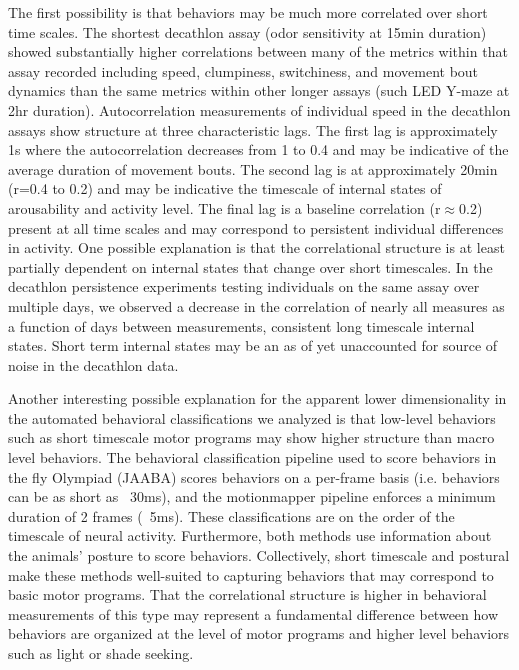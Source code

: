 \documentclass[12pt,letterpaper]{article}
\begin{document}
The first possibility is that behaviors may be much more correlated over short time scales. The shortest decathlon assay (odor sensitivity at 15min duration) showed substantially higher correlations between many of the metrics within that assay recorded including speed, clumpiness, switchiness, and movement bout dynamics than the same metrics within other longer assays (such LED Y-maze at 2hr duration).   Autocorrelation measurements of individual speed in the decathlon assays show structure at three characteristic lags. The first lag is approximately 1s where the autocorrelation decreases from 1 to 0.4 and may be indicative of the average duration of movement bouts. The second lag is at approximately 20min (r=0.4 to 0.2) and may be indicative the timescale of internal states of arousability and activity level. The final lag is a baseline correlation (r$\approx$0.2) present at all time scales and may correspond to persistent individual differences in activity. One possible explanation is that the correlational structure is at least partially dependent on internal states that change over short timescales. In the decathlon persistence experiments testing individuals on the same assay over multiple days, we observed a decrease in the correlation of nearly all measures as a function of days between measurements, consistent long timescale internal states. Short term internal states may be an as of yet unaccounted for source of noise in the decathlon data.

Another interesting possible explanation for the apparent lower dimensionality in the automated behavioral classifications we analyzed is that low-level behaviors such as short timescale motor programs may show higher structure than macro level behaviors. The behavioral classification pipeline used to score behaviors in the fly Olympiad (JAABA) scores behaviors on a per-frame basis (i.e. behaviors can be as short as ~30ms), and the motionmapper pipeline enforces a minimum duration of 2 frames (~5ms). These classifications are on the order of the timescale of neural activity. Furthermore, both methods use information about the animals' posture to score behaviors. Collectively, short timescale and postural make these methods well-suited to capturing behaviors that may correspond to basic motor programs. That the correlational structure is higher in behavioral measurements of this type may represent a fundamental difference between how behaviors are organized at the level of motor programs and higher level behaviors such as light or shade seeking.
\end{document}
